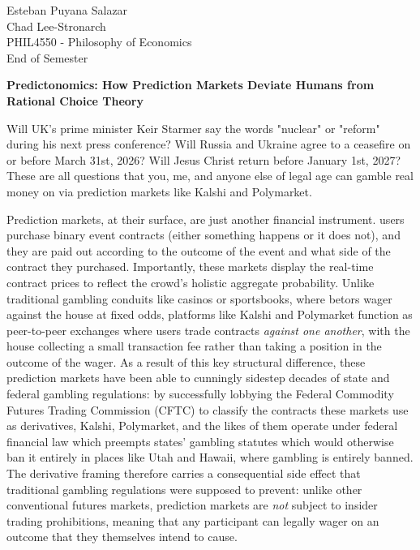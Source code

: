 \documentclass[12pt]{article}
\begin{document}
{\noindent
Esteban Puyana Salazar \\
Chad Lee-Stronarch \\
PHIL4550 - Philosophy of Economics \\
End of Semester
}

\vspace{0.5cm}

\begin{center}
\textbf{Predictonomics: How Prediction Markets Deviate Humans from Rational Choice Theory}
\end{center}

\thispagestyle{empty}  %

Will UK's prime minister Keir Starmer say the words "nuclear" or "reform" during his next press conference? Will Russia and Ukraine agree to a ceasefire on or before March 31st, 2026? Will Jesus Christ return before January 1st, 2027? These are all questions that you, me, and anyone else of legal age can gamble real money on via prediction markets like Kalshi and Polymarket.

Prediction markets, at their surface, are just another financial instrument. users purchase binary event contracts (either something happens or it does not), and they are paid out according to the outcome of the event and what side of the contract they purchased. Importantly, these markets display the real-time contract prices to reflect the crowd's holistic aggregate probability. Unlike traditional gambling conduits like casinos or sportsbooks, where betors wager against the house at fixed odds, platforms like Kalshi and Polymarket function as peer-to-peer exchanges where users trade contracts \textit{against one another}, with the house collecting a small transaction fee rather than taking a position in the outcome of the wager. As a result of this key structural difference, these prediction markets have been able to cunningly sidestep decades of state and federal gambling regulations: by successfully lobbying the Federal Commodity Futures Trading Commission (CFTC) to classify the contracts these markets use as derivatives, Kalshi, Polymarket, and the likes of them operate under federal financial law which preempts states' gambling statutes which would otherwise ban it entirely in places like Utah and Hawaii, where gambling is entirely banned. The derivative framing therefore carries a consequential side effect that traditional gambling regulations were supposed to prevent: unlike other conventional futures markets, prediction markets are \textit{not} subject to insider trading prohibitions, meaning that any participant can legally wager on an outcome that they themselves intend to cause.
\end{document}
